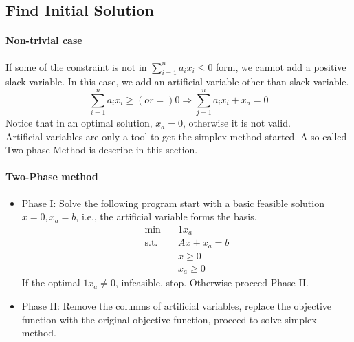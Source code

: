             \subsection{Find Initial Solution}
                \paragraph{Non-trivial case}
                    If some of the constraint is not in $\sum_{i=1}^na_ix_i \le 0$ form, we cannot add a positive slack variable. In this case, we add an artificial variable other than slack variable.
                    \begin{equation}
                        \sum_{i=1}^n a_ix_i \ge (or =) 0 \Rightarrow \sum_{j=1}^n a_ix_i + x_a = 0 \nonumber
                    \end{equation}
                    Notice that in an optimal solution, $x_a = 0$, otherwise it is not valid.\\
                    Artificial variables are only a tool to get the simplex method started. A so-called Two-phase Method is describe in this section.
                
                \paragraph{Two-Phase method}
                    \begin{itemize}
                        \item Phase I: Solve the following program start with a basic feasible solution $x=0, x_a=b$, i.e., the artificial variable forms the basis.
                        \begin{align}
                            \min \quad & 1x_a \nonumber\\
                            \text{s.t.} \quad & Ax + x_a = b \nonumber\\
                                              & x \ge 0 \nonumber\\
                                              & x_a \ge 0 \nonumber
                        \end{align}
                        If the optimal $1x_a \ne 0$, infeasible, stop. Otherwise proceed Phase II.
                        \item Phase II: Remove the columns of artificial variables, replace the objective function with the original objective function, proceed to solve simplex method.
                    \end{itemize}               
                    
